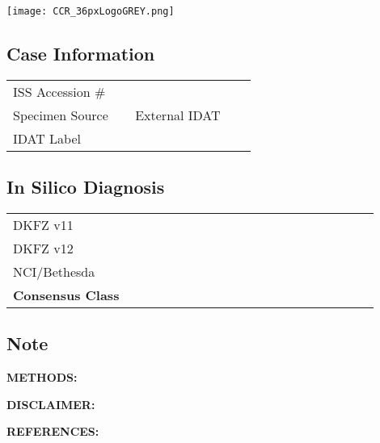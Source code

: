 \documentclass[
	letterpaper, %
	10pt, %
]{CSSullivanBusinessReport}
\begin{document}

\thispagestyle{empty} %

\vspace*{-0.075\textheight} %

\hspace*{-0.55cm}\texttt{[image: CCR\_36pxLogoGREY.png]} %

{\fontsize{18pt}{20pt}\selectfont\raggedright\textbf{\reporttitle}\par} %

{\textit{\textbf{\reportsubtitle}}\par} %

{\reportdate\par} %

\subsection*{Case Information}

\begin{tabular}{@{} L{0.3\linewidth} L{0.3\linewidth} @{}} %
	\toprule
	ISS Accession \# & \\
	Specimen Source & External IDAT\\
	IDAT Label & \\
	\bottomrule
\end{tabular}

\subsection*{In Silico Diagnosis}
\begin{tabular}{@{} L{0.3\linewidth} L{0.3\linewidth} L{0.3\linewidth} @{}} %
	\toprule
	DKFZ v11 &  & \\
	DKFZ v12 &  & \\
	NCI/Bethesda &  & \\
	\textbf{Consensus Class} & \textbf{}\\
	\bottomrule
\end{tabular}

\par
\subsection*{Note}


{\footnotesize
\textbf{METHODS:} 

\textbf{DISCLAIMER:} 

\textbf{REFERENCES:}\\ 
}
\end{document}
